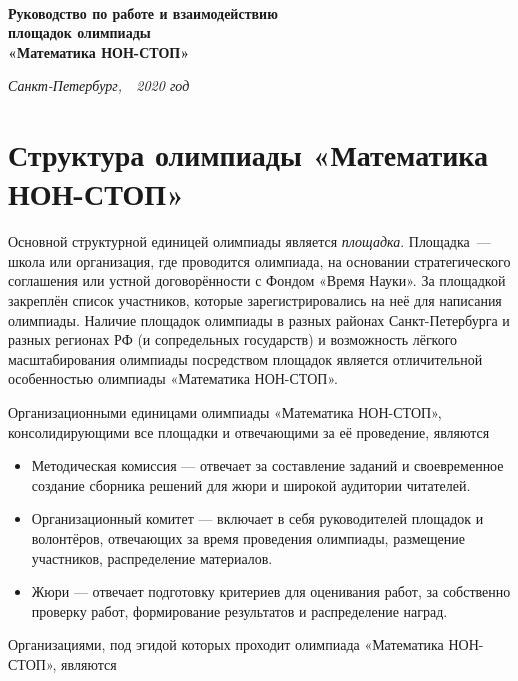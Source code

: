 \documentclass[a4paper,12pt]{article}
\newcommand{\mns}{«Математика НОН-СТОП»\xspace}
\begin{document}
\begin{center} {\LARGE\bf \ \\
	Руководство по работе и взаимодействию \\
	площадок олимпиады \\
	\mns \\}
\end{center}

\begin{flushright} {\it
	Санкт-Петербург,\ \ 2020 год}
\end{flushright}

\section{Структура олимпиады \mns}

Основной структурной единицей олимпиады является {\itshape площадка}. Площадка~— школа или организация, где проводится олимпиада, на основании стратегического соглашения или устной договорённости с Фондом «Время Науки». За площадкой закреплён список участников, которые зарегистрировались на неё для написания олимпиады. Наличие площадок олимпиады в разных районах Санкт-Петербурга и разных регионах РФ (и сопредельных государств) и возможность лёгкого масштабирования олимпиады посредством площадок является отличительной особенностью олимпиады \mns.

Организационными единицами олимпиады \mns, консолидирующими все площадки и отвечающими за её проведение, являются \vspace{-4mm}

\begin{itemize}
\item Методическая комиссия — отвечает за составление заданий и своевременное создание сборника решений для жюри и широкой аудитории читателей.

\item Организационный комитет — включает в себя руководителей площадок и волонтёров, отвечающих за время проведения олимпиады, размещение участников, распределение материалов.

\item Жюри — отвечает подготовку критериев для оценивания работ, за собственно проверку работ, формирование результатов и распределение наград.
\end{itemize}

Организациями, под эгидой которых проходит олимпиада \mns, являются \vspace{-4mm}
\end{document}
